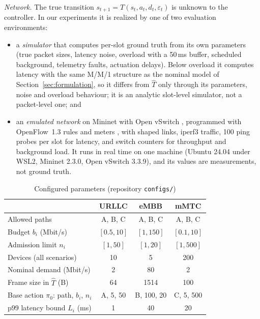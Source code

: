 \documentclass[conference]{IEEEtran}
\newcommand{\That}{\hat{T}}
\begin{document}
\emph{Network.} The true transition $s_{t+1} = T(s_t, a_t, d_t, \varepsilon_t)$ is
unknown to the controller. In our experiments it is realized by one of two
evaluation environments:
\begin{itemize}
\item a \emph{simulator} that computes per-slot ground truth from its own parameters
(true packet sizes, latency noise, overload with a 50\,ms buffer, scheduled
background, telemetry faults, actuation delays). Below overload it computes latency
with the same M/M/1 structure as the nominal model of Section~\ref{sec:formulation},
so it differs from $\That$ only through its parameters, noise and overload behaviour;
it is an analytic slot-level simulator, not a packet-level one; and
\item an \emph{emulated network} on Mininet \cite{lantz2010mininet} with Open vSwitch
\cite{pfaff2015ovs}, programmed with OpenFlow~1.3 rules and meters
\cite{openflow13spec}, with shaped links, iperf3 traffic, 100 ping probes per slot
for latency, and switch counters for throughput and background load. It runs in real
time on one machine (Ubuntu 24.04 under WSL2, Mininet 2.3.0, Open vSwitch 3.3.9),
and its values are measurements, not ground truth.
\end{itemize}

\begin{table}[t]
\caption{Configured parameters (repository \texttt{configs/})}
\label{tab:params}
\centering
\footnotesize
\setlength{\tabcolsep}{3pt}
\begin{tabular}{@{}lccc@{}}
\toprule
& URLLC & eMBB & mMTC\\
\midrule
Allowed paths & A, B, C & A, B, C & A, B, C\\
Budget $b_i$ (Mbit/s) & $[0.5, 10]$ & $[1, 150]$ & $[0.1, 10]$\\
Admission limit $n_i$ & $[1, 50]$ & $[1, 20]$ & $[1, 500]$\\
Devices (all scenarios) & 10 & 5 & 200\\
Nominal demand (Mbit/s) & 2 & 80 & 2\\
Frame size in $\That$ (B) & 64 & 1514 & 100\\
Base action $\pi_0$: path, $b_i$, $n_i$ & A, 5, 50 & B, 100, 20 & C, 5, 500\\
p99 latency bound $L_i$ (ms) & 1 & 40 & 20\\
\bottomrule
\end{tabular}
\end{table}
\end{document}

